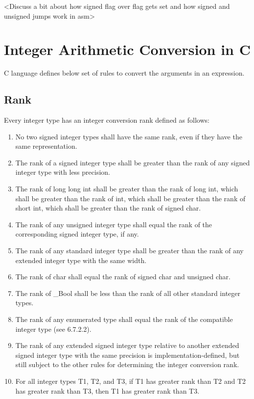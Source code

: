 \documentclass{article}
\begin{document}
<Discuss a bit about how signed flag over flag gets set and how signed and
unsigned jumps work in asm>


\section{Integer Arithmetic Conversion in C}
C language defines below set of rules to convert the arguments in an expression.

\subsection{Rank}
Every integer type has an integer conversion rank defined as follows:
\begin{enumerate}[noitemsep]
    \item No two signed integer types shall have the same rank, even if they have the same
    representation.
    \item The rank of a signed integer type shall be greater than the rank of any signed integer
    type with less precision.
    \item The rank of long long int shall be greater than the rank of long int, which
    shall be greater than the rank of int, which shall be greater than the rank of short
    int, which shall be greater than the rank of signed char.
    \item The rank of any unsigned integer type shall equal the rank of the corresponding
    signed integer type, if any.
    \item The rank of any standard integer type shall be greater than the rank of any extended
    integer type with the same width.
    \item The rank of char shall equal the rank of signed char and unsigned char.
    \item The rank of \_Bool shall be less than the rank of all other standard integer types.
    \item The rank of any enumerated type shall equal the rank of the compatible integer type
    (see 6.7.2.2).
    \item The rank of any extended signed integer type relative to another extended signed
    integer type with the same precision is implementation-defined, but still subject to the
    other rules for determining the integer conversion rank.
    \item For all integer types T1, T2, and T3, if T1 has greater rank than T2 and T2 has
    greater rank than T3, then T1 has greater rank than T3.
\end{enumerate}
\end{document}
